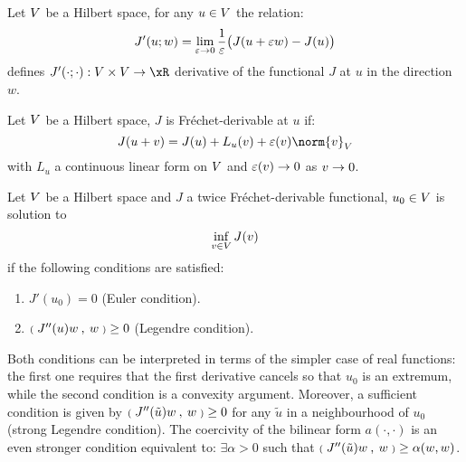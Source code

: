 \begin{dfntn}
Let ${V}$ be a Hilbert space, for any $u\in{V}$ the relation:
\begin{equation}\label{eq:directional_derivative}
J'(u; w) = \lim_{\varepsilon\rightarrow 0} \displaystyle \frac{1}{\varepsilon}\bigr( J(u + \varepsilon w) - J(u) \bigl)
\end{equation}
defines $J'(\cdot; \cdot): \xV\times\xV \rightarrow\xR$ derivative of the functional $J$ at $u$ in the direction $w$.
\end{dfntn}

\begin{dfntn}
Let ${V}$ be a Hilbert space, $J$ is Fréchet-derivable at $u$ if:
\begin{equation}\label{eq:directional_derivative}
J(u + v) =  J(u) + L_u(v) + \varepsilon(v) \norm{v}_\xV
\end{equation}
with $L_u$ a continuous linear form on ${V}$ and $\varepsilon(v)\rightarrow 0$ as $v \rightarrow 0$.
\end{dfntn}

\begin{prpstn}
Let ${V}$ be a Hilbert space and $J$ a twice Fréchet-derivable functional, $u_0 \in{V}$ is solution to
\begin{equation}\label{eq:minimization}
\inf_{v\in{V}} J(v)
\end{equation}
if the following conditions are satisfied:
\begin{enumerate}
\item $J'(u_0) = 0$ (Euler condition).
\item ${{\scriptstyle\mathbf{(}}\;J''(u)w\:,\: w \;{\scriptstyle\mathbf{)}}} \geq 0$ (Legendre condition).
\end{enumerate}
\end{prpstn}

Both conditions can be interpreted in terms of the simpler case of real functions: the first one requires that the first derivative cancels so that $u_0$ is an extremum, while the second condition is a convexity argument.
Moreover, a sufficient condition is given by ${{\scriptstyle\mathbf{(}}\;J''(\tilde u)w\:,\: w \;{\scriptstyle\mathbf{)}}} \geq 0$ for any $\tilde u$ in a neighbourhood of $u_0$ (strong Legendre condition).
The coercivity of the bilinear form $a(\cdot, \cdot)$ is an even stronger condition equivalent to: $\exists \alpha > 0$ such that ${{\scriptstyle\mathbf{(}}\;J''(\tilde u)w\:,\: w \;{\scriptstyle\mathbf{)}}} \geq \alpha (w,w)$.

